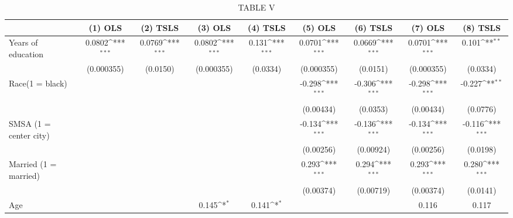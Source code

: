 \begin{table}[htbp]\centering
\def\sym#1{\ifmmode^{#1}\else\(^{#1}\)\fi}
\caption{TABLE V}
\begin{tabular}{l*{8}{c}}
\hline\hline
                         &\multicolumn{1}{c}{(1) OLS}&\multicolumn{1}{c}{(2) TSLS}&\multicolumn{1}{c}{(3) OLS}&\multicolumn{1}{c}{(4) TSLS}&\multicolumn{1}{c}{(5) OLS}&\multicolumn{1}{c}{(6) TSLS}&\multicolumn{1}{c}{(7) OLS}&\multicolumn{1}{c}{(8) TSLS}\\
\hline
Years of education       &      0.0802\sym{***}&      0.0769\sym{***}&      0.0802\sym{***}&       0.131\sym{***}&      0.0701\sym{***}&      0.0669\sym{***}&      0.0701\sym{***}&       0.101\sym{**} \\
                         &  (0.000355)         &    (0.0150)         &  (0.000355)         &    (0.0334)         &  (0.000355)         &    (0.0151)         &  (0.000355)         &    (0.0334)         \\
[1em]
Race(1 = black)          &                     &                     &                     &                     &      -0.298\sym{***}&      -0.306\sym{***}&      -0.298\sym{***}&      -0.227\sym{**} \\
                         &                     &                     &                     &                     &   (0.00434)         &    (0.0353)         &   (0.00434)         &    (0.0776)         \\
[1em]
SMSA (1 = center city)   &                     &                     &                     &                     &      -0.134\sym{***}&      -0.136\sym{***}&      -0.134\sym{***}&      -0.116\sym{***}\\
                         &                     &                     &                     &                     &   (0.00256)         &   (0.00924)         &   (0.00256)         &    (0.0198)         \\
[1em]
Married (1 = married)    &                     &                     &                     &                     &       0.293\sym{***}&       0.294\sym{***}&       0.293\sym{***}&       0.280\sym{***}\\
                         &                     &                     &                     &                     &   (0.00374)         &   (0.00719)         &   (0.00374)         &    (0.0141)         \\
[1em]
Age                      &                     &                     &       0.145\sym{*}  &       0.141\sym{*}  &                     &                     &       0.116         &       0.117         \\

\end{tabular}
\end{table}
